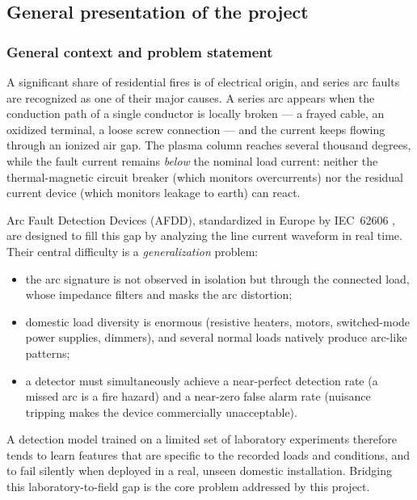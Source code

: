 \subsection{General presentation of the project}

\subsubsection{General context and problem statement}

A significant share of residential fires is of electrical origin, and series arc faults are recognized as one of their major causes. A series arc appears when the conduction path of a single conductor is locally broken --- a frayed cable, an oxidized terminal, a loose screw connection --- and the current keeps flowing through an ionized air gap. The plasma column reaches several thousand degrees, while the fault current remains \emph{below} the nominal load current: neither the thermal-magnetic circuit breaker (which monitors overcurrents) nor the residual current device (which monitors leakage to earth) can react.

\medskip

Arc Fault Detection Devices (AFDD), standardized in Europe by IEC~62606 \cite{iec62606}, are designed to fill this gap by analyzing the line current waveform in real time. Their central difficulty is a \emph{generalization} problem:

\begin{itemize}[itemsep=2pt]
    \item the arc signature is not observed in isolation but through the connected load, whose impedance filters and masks the arc distortion;
    \item domestic load diversity is enormous (resistive heaters, motors, switched-mode power supplies, dimmers), and several normal loads natively produce arc-like patterns;
    \item a detector must simultaneously achieve a near-perfect detection rate (a missed arc is a fire hazard) and a near-zero false alarm rate (nuisance tripping makes the device commercially unacceptable).
\end{itemize}

A detection model trained on a limited set of laboratory experiments therefore tends to learn features that are specific to the recorded loads and conditions, and to fail silently when deployed in a real, unseen domestic installation. Bridging this laboratory-to-field gap is the core problem addressed by this project.

